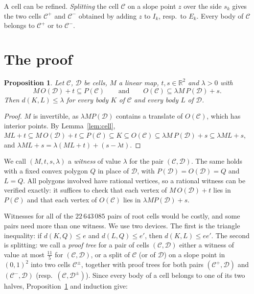 \documentclass[11pt]{amsart}
\newtheorem{proposition}[theorem]{Proposition}
\theoremstyle{definition}
\theoremstyle{remark}
\newcommand{\dBM}{d}
\newcommand{\R}{\mathbb R}
\newcommand{\C}{\mathcal C}
\newcommand{\D}{\mathcal D}
\begin{document}
A cell can be refined. \emph{Splitting} the cell $\C$ on a slope point $z$ over the side $s_k$ gives the two cells $\C^+$ and
$\C^-$ obtained by adding $z$ to $I_k$, resp.\ to $E_k$. Every body of $\C$ belongs to $\C^+$ or to $\C^-$.

\section{The proof}\label{sec:proof}

\begin{proposition}\label{prop:cellbound}
Let $\C$, $\D$ be cells, $M$ a linear map, $t,s\in\R^2$ and $\lambda>0$ with
\[
  M\,O(\D)+t\subseteq P(\C)\qquad\text{and}\qquad O(\C)\subseteq\lambda M\,P(\D)+s .
\]
Then $\dBM(K,L)\le\lambda$ for every body $K$ of $\C$ and every body $L$ of $\D$.
\end{proposition}

\begin{proof}
$M$ is invertible, as $\lambda MP(\D)$ contains a translate of $O(\C)$, which has interior points. By Lemma~\ref{lem:cell},
$M L+t\subseteq M\,O(\D)+t\subseteq P(\C)\subseteq K\subseteq O(\C)\subseteq\lambda M\,P(\D)+s\subseteq\lambda ML+s$,
and $\lambda ML+s=\lambda(ML+t)+(s-\lambda t)$.
\end{proof}

We call $(M,t,s,\lambda)$ a \emph{witness} of value $\lambda$ for the pair $(\C,\D)$. The same holds with a fixed convex
polygon $Q$ in place of $\D$, with $P(\D)=O(\D)=Q$ and $L=Q$. All polygons involved have rational vertices, so a
rational witness can be verified exactly: it suffices to check that each vertex of $M\,O(\D)+t$ lies in $P(\C)$ and that each
vertex of $O(\C)$ lies in $\lambda MP(\D)+s$.

Witnesses for all of the $22\,643\,085$ pairs of root cells would be costly, and some pairs need more than one
witness. We use two devices. The first is the triangle inequality: if $\dBM(K,Q)\le e$ and $\dBM(L,Q)\le e'$, then
$\dBM(K,L)\le ee'$. The second is splitting: we call a \emph{proof tree} for a pair of cells $(\C,\D)$ either a witness of value at
most $\frac{11}5$ for $(\C,\D)$, or a split of $\C$ (or of $\D$) on a slope point in $(0,1)^2$ into two cells $\C^\pm$, together with proof trees for
both pairs $(\C^+,\D)$ and $(\C^-,\D)$ (resp.\ $(\C,\D^\pm)$). Since every body of a cell belongs to one of its two halves,
Proposition~\ref{prop:cellbound} and induction give:
\end{document}
